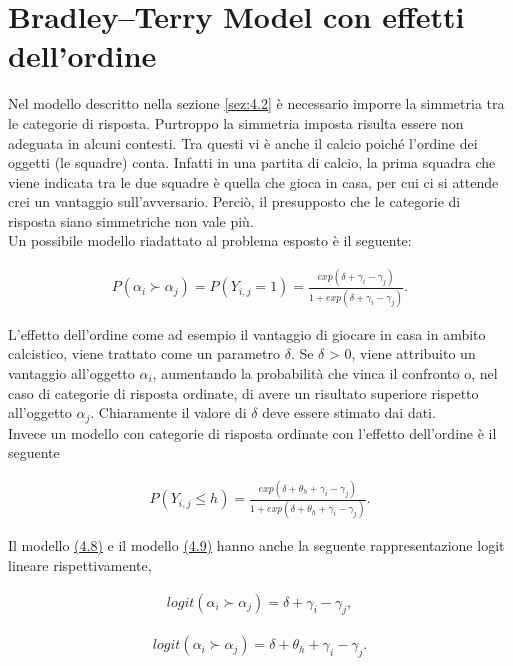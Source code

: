 \section{Bradley–Terry Model con effetti dell'ordine} \label{sez:4.3}
Nel modello descritto nella sezione \ref{sez:4.2} è necessario imporre la simmetria tra le categorie di risposta. Purtroppo la simmetria imposta risulta essere non adeguata in alcuni contesti. Tra questi vi è anche il calcio poiché l'ordine dei oggetti (le squadre) conta. Infatti in una partita di calcio, la prima squadra che viene indicata tra le due squadre è quella che gioca in casa, per cui ci si attende crei un vantaggio sull'avversario. Perciò, il presupposto che le categorie di risposta siano simmetriche non vale più. \\
Un possibile modello riadattato al problema esposto è il seguente:

\begin{align} 
	P(\alpha_{i}\succ \alpha_{j}) = P(Y_{i,j} = 1) = \frac{exp(\delta + \gamma_{i} - \gamma_{j})}{1 + exp(\delta + \gamma_{i} - \gamma_{j})} \label{for:3.8}. 
\end{align}

L'effetto dell'ordine come ad esempio il vantaggio di giocare in casa in ambito calcistico, viene trattato come un parametro $\delta$. Se $\delta$ > 0, viene attribuito un vantaggio all'oggetto $\alpha_{i}$, aumentando la probabilità che vinca il confronto o, nel caso di categorie di risposta ordinate, di avere un risultato superiore rispetto all'oggetto $\alpha_{j}$. Chiaramente il valore di $\delta$ deve essere stimato dai dati.\\

Invece un modello con categorie di risposta ordinate con l'effetto dell'ordine è il seguente

\begin{align}
	P(Y_{i,j}\leq h) =  \frac{exp(\delta + \theta_{h} + \gamma_{i} - \gamma_{j})}{1 + exp(\delta + \theta_{h} + \gamma_{i} - \gamma_{j})} \label{for:3.9}.
\end{align}

Il modello \hyperref[for:3.8]{(4.8)} e il modello \hyperref[for:3.9]{(4.9)} hanno anche la seguente rappresentazione logit lineare rispettivamente,

\begin{align}
	logit(\alpha_{i} \succ \alpha_{j}) =  \delta + \gamma_i - \gamma_j,
\end{align}

\begin{align}
	logit(\alpha_{i} \succ \alpha_{j}) =  \delta + \theta_{h} + \gamma_i - \gamma_j.
\end{align}
	
